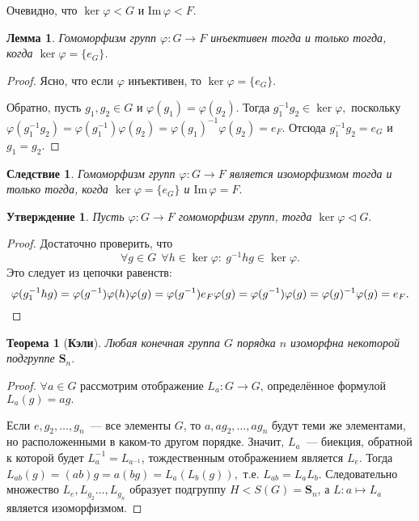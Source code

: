 \documentclass[a4paper, 14pt]{extarticle}
\newcommand{\n}{\par}
\newcommand{\symmetrical}{\mathbf{S}}
\newcommand{\suchthat}{{:}{ } \ }
\newcommand{\im}{\mathrm{Im} \,}
\renewcommand{\phi}{\varphi}
\theoremstyle{definition}
\theoremstyle{plain}
\newtheorem*{theorem*}{Теорема}
\numberwithin{theorem}{section}
\numberwithin{definition}{section}
\newtheorem{statement}{Утверждение}
\numberwithin{statement}{section}
\newtheorem{lemma}{Лемма}
\numberwithin{lemma}{section}
\newtheorem*{consequence*}{Следствие}
\numberwithin{consequence}{section}
\begin{document}
	Очевидно, что $\ker \phi < G$ и Im$\, \phi < F.$
	\begin{lemma}
		Гомоморфизм групп ${\phi: G \rightarrow F}$ инъективен тогда и только тогда, когда  $\ker \phi = \{e_G\}$.
	\end{lemma}
	\begin{proof}
		Ясно, что если $\phi$ инъективен, то $\ker \phi = \{e_G\}.$ \n
		Обратно, пусть ${g_1, g_2 \in G}$ и ${\phi(g_1) = \phi(g_2).}$ Тогда ${g^{-1}_1g_2 \in \ker \phi,}$ поскольку ${\phi(g^{-1}_1g_2) = \phi(g^{-1}_1) \phi(g_2) = \phi(g_1)^{-1} \phi(g_2) = e_F.}$ Отсюда $g^{-1}_1g_2 = e_G$ и $g_1 = g_2.$
	\end{proof}
	\begin{consequence*}
		Гомоморфизм групп ${\phi: G \rightarrow F}$ является изоморфизмом тогда и только тогда, когда ${\ker \phi = \{e_G\}}$ и ${\im \phi = F.}$
	\end{consequence*}
	\begin{statement}
		Пусть ${\phi: G \rightarrow F}$ гомоморфизм групп, тогда ${\ker \phi \lhd G.}$
	\end{statement}
	\begin{proof}
		Достаточно проверить, что
		\begin{equation*}
			\forall g \in G \ \ \forall h \in \ker \phi\suchthat g^{-1}hg \in \ker \phi.
		\end{equation*}
		Это следует из цепочки равенств:
		\begin{equation*}
			\phi(g^{-1}_1hg) = \phi(g^{-1}) \phi(h) \phi(g) = \phi(g^{-1}) e_F \phi(g) = \phi(g^{-1}) \phi(g) = \phi(g)^{-1} \phi(g) = e_F. \qedhere
		\end{equation*}
	\end{proof}
        \newpage
        \begin{theorem*}[\textbf{Кэли}]
		Любая конечная группа $G$ порядка $n$ изоморфна некоторой подгруппе $\symmetrical_n.$
	\end{theorem*}
	\begin{proof}
		  $\forall {a \in G}$ рассмотрим отображение ${L_a : G \rightarrow G}$, определённое формулой ${L_a(g) = ag.}$\n
          Если $e, g_2,\ldots,g_n$~--- все элементы $G$, то $a, ag_2,\ldots,ag_n$ будут теми же элементами, но расположенными в каком-то другом порядке. Значит, $L_a$~--- биекция, обратной к которой будет $L_a^{-1} = L_{a^{-1}}$, тождественным отображением является $L_e$. Тогда $L_{ab}(g) = (ab)g = a(bg) = L_a(L_b(g)),$ т.е. $L_{ab} = L_a L_b.$ Следовательно множество $L_e, L_{g_2}\ldots,L_{g_n}$ образует подгруппу ${H < S(G) = \symmetrical_n}$, а ${L : a \mapsto L_a}$ является изоморфизмом.
	\end{proof}
	\newpage
\end{document}
